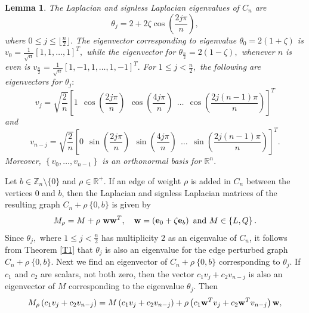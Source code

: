 \documentclass[12pt,a4paper]{article}
\newtheorem{lem}{Lemma}
\def \e {{\mathbf e}}
\def \w {{\bf w}}
\newcommand{\ob}[1]{\left(#1\right)}
\newcommand{\cb}[1]{\left\lbrace #1\right\rbrace}
\newcommand{\tb}[1]{\left[#1\right]}
\begin{document}
\begin{lem}\label{L3}
The Laplacian and signless Laplacian eigenvalues of $C_n$ are \[\theta_j= 2+2\zeta\cos\ob{\frac{2j\pi}{n}},\] where $0 \leq j \leq \lfloor \frac{n}{2} \rfloor.$ The eigenvector corresponding to eigenvalue $\theta_0=2\ob{1+\zeta}$ is $v_0= \frac{1}{\sqrt{n}}[1,1,\ldots,1]^T,$ while the eigenvector for $\theta_{\frac{n}{2}}=2\ob{1-\zeta},$ whenever $n$ is even is $v_{\frac{n}{2}}=\frac{1}{\sqrt{n}}[1,-1,1,\ldots,1,-1]^T.$ For $1 \leq j < \frac{n}{2},$ the following are eigenvectors for $\theta_j:$
$$v_j=\sqrt{\frac{2}{n}}\tb{1 ~~\cos\ob{\frac{2j\pi}{n}} ~~ \cos\ob{\frac{4j\pi}{n}} ~~ \ldots~~ \cos\ob{\frac{2j(n-1)\pi}{n}}}^T $$
and $$v_{n-j}=\sqrt{\frac{2}{n}}\tb{0 ~~\sin\ob{\frac{2j\pi}{n}} ~~ \sin\ob{\frac{4j\pi}{n}} ~~ \ldots~~ \sin\ob{\frac{2j(n-1)\pi}{n}}}^T.$$ Moreover, $\cb{v_0,\ldots, v_{n-1}}$ is an orthonormal basis for $\mathbb{R}^n.$
\end{lem}

Let $b \in \mathbb{Z}_n\setminus \{0\}$ and $\rho \in \mathbb{R}^{+}$. If an edge of weight $\rho$ is added in $C_n$ between the vertices $0$ and $b$, then the Laplacian and signless Laplacian matrices of the resulting graph $C_n+\rho~\{0,b\}$ is given by $$M_{\rho}=M+\rho~\w\w^T, \quad \w=\ob{\e_0+\zeta\e_b} \text{ and } M\in\cb{L, Q}.$$
Since $\theta_j,$ where $1 \leq j < \frac{n}{2}$ has multiplicity $2$ as an eigenvalue of $C_n$, it follows from Theorem \ref{T1} that $\theta_j$ is also an eigenvalue for the edge perturbed graph $C_n+\rho~\{0,b\}.$ Next we find an eigenvector of $C_n+\rho~\{0,b\}$ corresponding to $\theta_j.$ If $c_1$ and $c_2$ are scalars, not both zero, then the vector $c_1 v_j + c_2 v_{n-j}$ is also an eigenvector of $M$ corresponding to the eigenvalue $\theta_j$. Then  
$$M_{\rho}\ob{c_1v_j+c_2v_{n-j}} =M\ob{c_1v_j+c_2v_{n-j}}+\rho\ob{c_1\w^Tv_j+c_2\w^Tv_{n-j}}\w,$$
\end{document}
